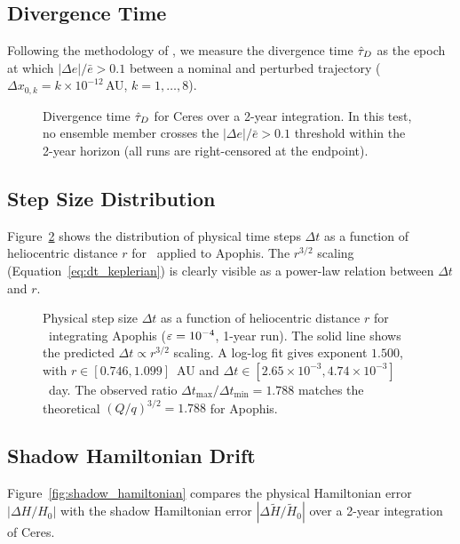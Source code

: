 \subsection{Divergence Time}
\label{sec:divergence_bench}

Following the methodology of \citet{Zeebe2023}, we measure the
divergence time $\hat{\tau}_D$ as the epoch at which
$|\Delta e|/\bar{e} > 0.1$ between a nominal and perturbed trajectory
($\Delta x_{0,k} = k \times 10^{-12}$\,AU, $k = 1,\ldots,8$).

\begin{figure}
\caption{
  Divergence time $\hat{\tau}_D$ for Ceres over a 2-year integration.
  In this test, no ensemble member crosses the
  $|\Delta e|/\bar{e}>0.1$ threshold within the 2-year horizon
  (all runs are right-censored at the endpoint).
  \label{fig:divergence_time}
}
\end{figure}

\subsection{Step Size Distribution}
\label{sec:step_dist}

Figure~\ref{fig:step_distribution} shows the distribution of
physical time steps $\Delta t$ as a function of heliocentric
distance $r$ for \AAS\ applied to Apophis.
The $r^{3/2}$ scaling (Equation~\ref{eq:dt_keplerian}) is clearly
visible as a power-law relation between $\Delta t$ and $r$.

\begin{figure}
\caption{
  Physical step size $\Delta t$ as a function of heliocentric
  distance $r$ for \AAS\ integrating Apophis ($\varepsilon = 10^{-4}$,
  1-year run).
  The solid line shows the predicted $\Delta t \propto r^{3/2}$
  scaling. A log-log fit gives exponent $1.500$, with
  $r\in[0.746,1.099]$~AU and
  $\Delta t\in[2.65\times10^{-3},4.74\times10^{-3}]$~day.
  The observed ratio $\Delta t_{\max}/\Delta t_{\min}=1.788$
  matches the theoretical $(Q/q)^{3/2}=1.788$ for Apophis.
  \label{fig:step_distribution}
}
\end{figure}

\subsection{Shadow Hamiltonian Drift}
\label{sec:shadow_bench}

Figure~\ref{fig:shadow_hamiltonian} compares the physical Hamiltonian
error $|\Delta H/H_0|$ with the shadow Hamiltonian error
$|\Delta\tilde{H}/\tilde{H}_0|$ over a 2-year integration of Ceres.

